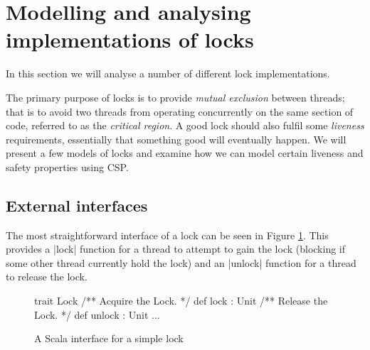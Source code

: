 \section{Modelling and analysing implementations of locks}
\label{sec:locks}




In this section we will analyse a number of different lock implementations. 

The primary purpose of locks is to provide \emph{mutual exclusion} between threads; that is to avoid two threads from operating concurrently on the same section of code, referred to as the \emph{critical region}. A good lock should also fulfil some \emph{liveness} requirements, essentially that something good will eventually happen. We will present a few models of locks and examine how we can model certain liveness and safety properties using CSP.


\subsection{External interfaces}

The most straightforward interface of a lock can be seen in Figure \ref{code:LockInterface}. This provides a |lock| function for a thread to attempt to gain the lock (blocking if some other thread currently hold the lock) and an |unlock| function for a thread to release the lock. 

\begin{figure}[H]
\begin{scala}
  trait Lock{
    /** Acquire the Lock. */
    def lock : Unit
    /** Release the Lock. */
    def unlock : Unit 
    ...
  }
\end{scala}
\caption{A Scala interface for a simple lock}
\label{code:LockInterface}
\end{figure}

